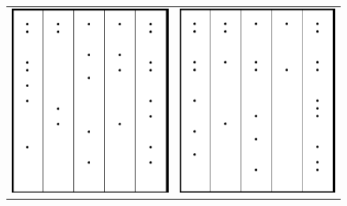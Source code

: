 \documentclass[a4paper, 11pt]{article}
\begin{document}
\begin{figure}[H]
\begin{center}
\begin{tabular}{c c}
\includegraphics[scale=0.2]{Images/5By5One.png} &
\includegraphics[scale=0.2]{Images/5By5Two.png}

\end{tabular}
\end{center}
\end{figure}
\end{document}
